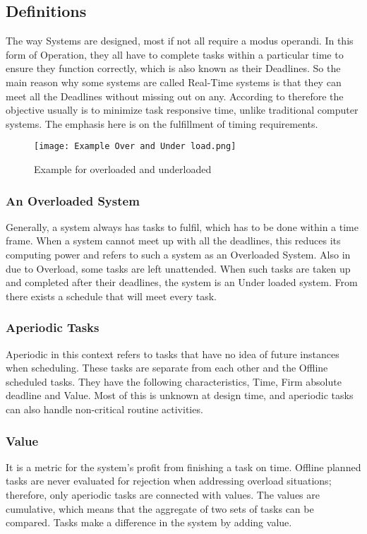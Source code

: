 \documentclass[conference]{IEEEtran}
\begin{document}
\subsection{Definitions}
The way Systems are designed, most if not all require a modus operandi. In this form of Operation, they all have to complete tasks within a particular time to ensure they function correctly, which is also known as their Deadlines. So the main reason why some systems are called Real-Time systems is that they can meet all the Deadlines without missing out on any. According to  \cite{620484} therefore the objective usually is to minimize task responsive time, unlike traditional computer systems. The emphasis here is on the fulfillment of timing requirements.

\begin{figure}[htp]
    \centering
    \texttt{[image: Example Over and Under load.png]}
    \caption{Example for overloaded and underloaded{\cite{7515899}}}
    \label{fig:reg-gen}
\end{figure}



\subsubsection{An Overloaded System}
 Generally, a system always has tasks to fulfil, which has to be done within a time frame. When a system cannot meet up with all the deadlines, this reduces its computing power and refers to such a system as an Overloaded System. Also in due to Overload, some tasks are left unattended. When such tasks are taken up and completed after their deadlines, the system is an Under loaded system. From  \cite{185354}  there exists a schedule that will meet every task.
\subsubsection{Aperiodic Tasks}
Aperiodic in this context refers to tasks that have no idea of future instances when scheduling. These tasks are separate from each other and the Offline scheduled tasks. They have the following characteristics, Time, Firm absolute deadline and Value. Most of this is unknown at design time, and aperiodic tasks can also handle non-critical routine activities. \cite{1199244}

\subsubsection{Value}
It is a metric for the system's profit from finishing a task on time. Offline planned tasks are never evaluated for rejection when addressing overload situations; therefore, only aperiodic tasks are connected with values. The values are cumulative, which means that the aggregate of two sets of tasks can be compared. Tasks make a difference in the system by adding value.
\end{document}
